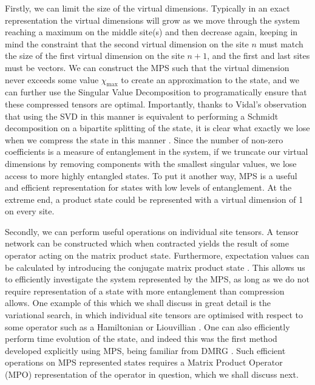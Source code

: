  Firstly, we can limit the size of the virtual dimensions. Typically in an exact representation the virtual dimensions will grow as we move through the system reaching a maximum on the middle site(s) and then decrease again, keeping in mind the constraint that the second virtual dimension on the site \(n\) must match the size of the first virtual dimension on the site \(n+1\), and the first and last sites must be vectors. We can construct the MPS such that the virtual dimension never exceeds some value \(\chi_{\mathrm{max}}\) to create an approximation to the state, and we can further use the Singular Value Decomposition to programatically ensure that these compressed tensors are optimal. Importantly, thanks to Vidal's observation that using the SVD in this manner is equivalent to performing a Schmidt decomposition on a bipartite splitting of the state, it is clear what exactly we lose when we compress the state in this manner \cite{Vidal03}. Since the number of non-zero coefficients is a measure of entanglement in the system, if we truncate our virtual dimensions by removing components with the smallest singular values, we lose access to more highly entangled states. To put it another way, MPS is a useful and efficient representation for states with low levels of entanglement. At the extreme end, a product state could be represented with a virtual dimension of 1 on every site. 
 
 Secondly, we can perform useful operations on individual site tensors. A tensor network can be constructed which when contracted yields the result of some operator acting on the matrix product state. Furthermore, expectation values can be calculated by introducing the conjugate matrix product state \cite{Schollwoeck11,Orus14}. This allows us to efficiently investigate the system represented by the MPS, as long as we do not require representation of a state with more entanglement than compression allows. One example of this which we shall discuss in great detail is the variational search, in which individual site tensors are optimised with respect to some operator such as a Hamiltonian or Liouvillian \cite{VPC04,CCB15}. One can also efficiently perform time evolution of the state, and indeed this was the first method developed explicitly using MPS, being familiar from DMRG \cite{Vidal04}. Such efficient operations on MPS represented states requires a Matrix Product Operator (MPO) representation of the operator in question, which we shall discuss next.  
 
